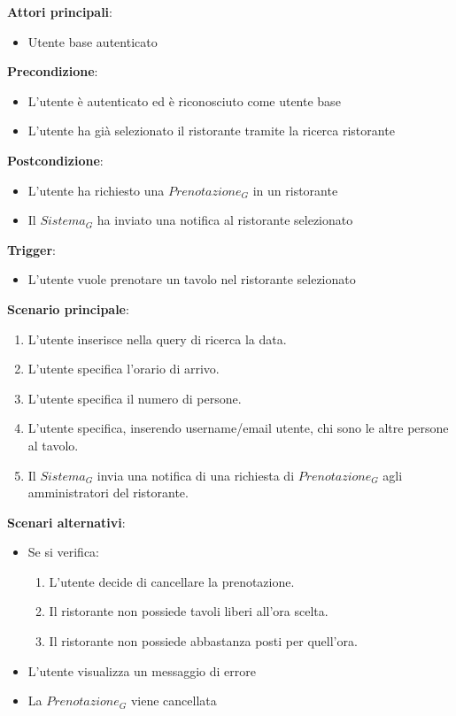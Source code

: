 \textbf{Attori principali}:
\begin{itemize}
    \item Utente base autenticato
\end{itemize}
\textbf{Precondizione}:
\begin{itemize}
    \item L'utente è autenticato ed è riconosciuto come utente base
    \item L'utente ha già selezionato il ristorante tramite la ricerca ristorante 
\end{itemize}
\textbf{Postcondizione}:
\begin{itemize}
    \item L'utente ha richiesto una $\textit{Prenotazione}_G$ in un ristorante
    \item Il $\textit{Sistema}_G$ ha inviato una notifica al ristorante selezionato
\end{itemize}
\textbf{Trigger}:
\begin{itemize}
    \item L'utente vuole prenotare un tavolo nel ristorante selezionato
\end{itemize}
\textbf{Scenario principale}:
\begin{enumerate}
    \item L'utente inserisce nella query di ricerca la data.
    \item L'utente specifica l'orario di arrivo.
    \item L'utente specifica il numero di persone.
    \item L'utente specifica, inserendo username/email utente, chi sono le altre persone al tavolo.
    \item Il $\textit{Sistema}_G$ invia una notifica di una richiesta di $\textit{Prenotazione}_G$ agli amministratori del ristorante.
\end{enumerate}
\textbf{Scenari alternativi}:
\begin{itemize}
    \item Se si verifica:
    \begin{enumerate}
        \item L'utente decide di cancellare la prenotazione.
        \item Il ristorante non possiede tavoli liberi all'ora scelta.
        \item Il ristorante non possiede abbastanza posti per quell'ora.
    \end{enumerate}
    \item L'utente visualizza un messaggio di errore
    \item La $\textit{Prenotazione}_G$ viene cancellata
\end{itemize}



